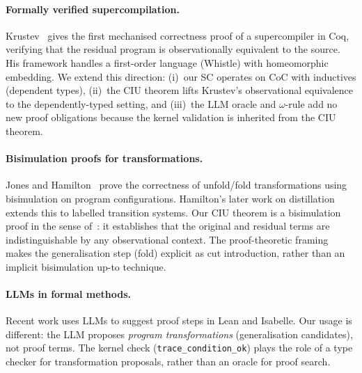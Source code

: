 \paragraph{Formally verified supercompilation.}
Krustev~\cite{krustev-2014-simple-sc-coq,krustev-2018-sc-flia} gives the first
mechanised correctness proof of a supercompiler in Coq, verifying that the
residual program is observationally equivalent to the source.  His framework
handles a first-order language (Whistle) with homeomorphic embedding.
We extend this direction: (i)~our SC operates on CoC with inductives
(dependent types), (ii)~the CIU theorem lifts Krustev's observational
equivalence to the dependently-typed setting, and (iii)~the LLM oracle
and $\omega$-rule add no new proof obligations because the kernel
validation is inherited from the CIU theorem.

\paragraph{Bisimulation proofs for transformations.}
Jones and Hamilton~\cite{jones-hamilton-2006-bisimulation} prove the correctness
of unfold/fold transformations using bisimulation on program configurations.
Hamilton's later work on distillation~\cite{hamilton-2007-distillation} extends
this to labelled transition systems.  Our CIU theorem is a bisimulation proof
in the sense of~\cite{jones-hamilton-2006-bisimulation}: it establishes that
the original and residual terms are indistinguishable by any observational
context.  The proof-theoretic framing makes the generalisation step (fold)
explicit as cut introduction, rather than an implicit bisimulation up-to
technique.

\paragraph{LLMs in formal methods.}
Recent work uses LLMs to suggest proof steps in Lean and Isabelle.
Our usage is different: the LLM proposes \emph{program transformations}
(generalisation candidates), not proof terms.  The kernel check
(\texttt{trace\_condition\_ok}) plays the role of a type checker for
transformation proposals, rather than an oracle for proof search.

